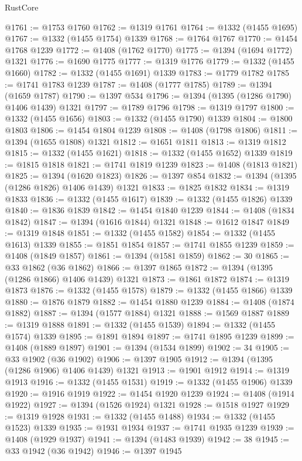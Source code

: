 \begin{lexlean}{RustCore}
\begin{coremodule}
@1761 := @1753 @1760
@1762 := @1319 @1761
@1764 := @1332 (@1455 @1695)
@1767 := @1332 (@1455 @1754) @1339
@1768 := @1764 @1767
@1770 := @1454 @1768 @1239
@1772 := @1408 (@1762 @1770)
@1775 := @1394 (@1694 @1772) @1321
@1776 := @1690 @1775
@1777 := @1319 @1776
@1779 := @1332 (@1455 @1660)
@1782 := @1332 (@1455 @1691) @1339
@1783 := @1779 @1782
@1785 := @1741 @1783 @1239
@1787 := @1408 (@1777 @1785)
@1789 := @1394 (@1659 @1787)
@1790 := @1397 @534
@1796 := @1394 (@1395 (@1286 @1790) @1406 @1439) @1321
@1797 := @1789 @1796
@1798 := @1319 @1797
@1800 := @1332 (@1455 @1656)
@1803 := @1332 (@1455 @1790) @1339
@1804 := @1800 @1803
@1806 := @1454 @1804 @1239
@1808 := @1408 (@1798 @1806)
@1811 := @1394 (@1655 @1808) @1321
@1812 := @1651 @1811
@1813 := @1319 @1812
@1815 := @1332 (@1455 @1621)
@1818 := @1332 (@1455 @1652) @1339
@1819 := @1815 @1818
@1821 := @1741 @1819 @1239
@1823 := @1408 (@1813 @1821)
@1825 := @1394 (@1620 @1823)
@1826 := @1397 @854
@1832 := @1394 (@1395 (@1286 @1826) @1406 @1439) @1321
@1833 := @1825 @1832
@1834 := @1319 @1833
@1836 := @1332 (@1455 @1617)
@1839 := @1332 (@1455 @1826) @1339
@1840 := @1836 @1839
@1842 := @1454 @1840 @1239
@1844 := @1408 (@1834 @1842)
@1847 := @1394 (@1616 @1844) @1321
@1848 := @1612 @1847
@1849 := @1319 @1848
@1851 := @1332 (@1455 @1582)
@1854 := @1332 (@1455 @1613) @1339
@1855 := @1851 @1854
@1857 := @1741 @1855 @1239
@1859 := @1408 (@1849 @1857)
@1861 := @1394 (@1581 @1859)
@1862 := 30
@1865 := @33 @1862 (@36 @1862)
@1866 := @1397 @1865
@1872 := @1394 (@1395 (@1286 @1866) @1406 @1439) @1321
@1873 := @1861 @1872
@1874 := @1319 @1873
@1876 := @1332 (@1455 @1578)
@1879 := @1332 (@1455 @1866) @1339
@1880 := @1876 @1879
@1882 := @1454 @1880 @1239
@1884 := @1408 (@1874 @1882)
@1887 := @1394 (@1577 @1884) @1321
@1888 := @1569 @1887
@1889 := @1319 @1888
@1891 := @1332 (@1455 @1539)
@1894 := @1332 (@1455 @1574) @1339
@1895 := @1891 @1894
@1897 := @1741 @1895 @1239
@1899 := @1408 (@1889 @1897)
@1901 := @1394 (@1534 @1899)
@1902 := 34
@1905 := @33 @1902 (@36 @1902)
@1906 := @1397 @1905
@1912 := @1394 (@1395 (@1286 @1906) @1406 @1439) @1321
@1913 := @1901 @1912
@1914 := @1319 @1913
@1916 := @1332 (@1455 @1531)
@1919 := @1332 (@1455 @1906) @1339
@1920 := @1916 @1919
@1922 := @1454 @1920 @1239
@1924 := @1408 (@1914 @1922)
@1927 := @1394 (@1526 @1924) @1321
@1928 := @1518 @1927
@1929 := @1319 @1928
@1931 := @1332 (@1455 @1488)
@1934 := @1332 (@1455 @1523) @1339
@1935 := @1931 @1934
@1937 := @1741 @1935 @1239
@1939 := @1408 (@1929 @1937)
@1941 := @1394 (@1483 @1939)
@1942 := 38
@1945 := @33 @1942 (@36 @1942)
@1946 := @1397 @1945

\end{coremodule}
\end{lexlean}
